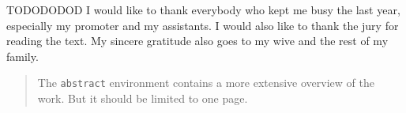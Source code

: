 \documentclass[master=eelt,masteroption=ei]{kulemt}
\begin{document}
\begin{preface}
TODODODOD
  I would like to thank everybody who kept me busy the last year,
  especially my promoter and my assistants. I would also like to thank the
  jury for reading the text. My sincere gratitude also goes to my wive and
  the rest of my family.
\end{preface}

\tableofcontents*

\begin{abstract}
  The \texttt{abstract} environment contains a more extensive overview of
  the work. But it should be limited to one page.
\end{abstract}

\mainmatter








% 
\clearpage

\printglossary[type=\acronymtype]


\backmatter



\end{document}
